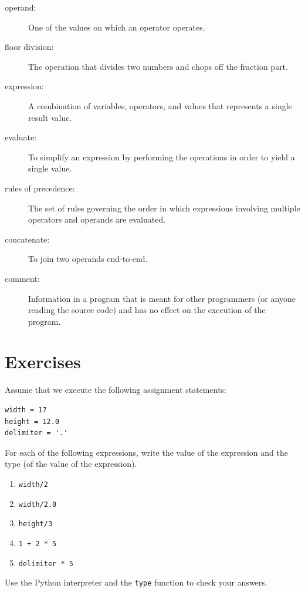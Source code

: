 \documentclass[10pt]{book}
\begin{document}
\begin{description}
\item[operand:]  One of the values on which an operator operates.

\item[floor division:] The operation that divides two numbers and chops off
the fraction part.

\item[expression:]  A combination of variables, operators, and values that
represents a single result value.

\item[evaluate:]  To simplify an expression by performing the operations
in order to yield a single value.

\item[rules of precedence:]  The set of rules governing the order in which
expressions involving multiple operators and operands are evaluated.

\item[concatenate:]  To join two operands end-to-end.

\item[comment:]  Information in a program that is meant for other
programmers (or anyone reading the source code) and has no effect on the
execution of the program.

\end{description}


\section{Exercises}

\begin{ex}
Assume that we execute the following assignment statements:

\begin{verbatim}
width = 17
height = 12.0
delimiter = '.'
\end{verbatim}

For each of the following expressions, write the value of the
expression and the type (of the value of the expression).

\begin{enumerate}

\item {\tt width/2}

\item {\tt width/2.0}

\item {\tt height/3}

\item {\tt 1 + 2 * 5}

\item {\tt delimiter * 5}

\end{enumerate}

Use the Python interpreter and the {\tt type} function to check your answers.
\end{ex}
\end{document}
